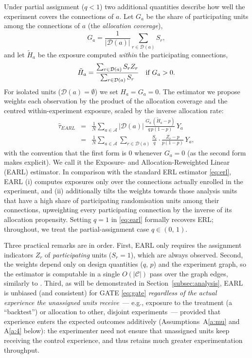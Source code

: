\documentclass[sigconf,anonymous,review]{acmart}
\begin{document}
Under partial assignment ($q<1$) two additional quantities describe how well the experiment covers the connections of $a$. Let $G_a$ be the share of participating units among the connections of $a$ (the \emph{allocation coverage}),
\begin{equation}\label{eq:Ga}
    G_a = \frac{1}{|\mathcal{D}(a)|}\sum_{r\in\mathcal{D}(a)} S_r,
\end{equation}
and let $\tilde H_a$ be the exposure computed \emph{within} the participating connections,
\begin{equation}\label{eq:Hta}
    \tilde H_a = \frac{\sum_{r\in\mathcal{D}(a)} S_rZ_r}{\sum_{r\in\mathcal{D}(a)} S_r}\quad\textup{if } G_a>0.
\end{equation}
For isolated units ($\mathcal D(a)=\emptyset$) we set $H_a = G_a = 0$.
The estimator we propose weights each observation by the product of the allocation coverage and the centred within-experiment exposure, scaled by the inverse allocation rate:
\begin{eqnarray}\label{eq:earl}
    \hat \tau_{EARL} &=& \frac 1 N \sum_{a\in \mathcal A} |\mathcal D(a)|\,\frac{G_a\,(\tilde H_a - p)}{q\,p(1-p)}\, Y_a \nonumber\\
    &=& \frac 1 N \sum_{a\in \mathcal A} \sum_{r\in\mathcal{D}(a)}\frac{S_r}{q}\cdot\frac{Z_r - p}{p(1-p)}\, Y_a,
\end{eqnarray}
with the convention that the first form is $0$ whenever $G_a=0$ (as the second form makes explicit). We call it the Exposure- and Allocation-Reweighted Linear (EARL) estimator. In comparison with the standard ERL estimator \eqref{eq:erl}, EARL (i) computes exposures only over the connections actually enrolled in the experiment, and (ii) additionally tilts the weights towards those analysis units that have a high share of participating randomisation units among their connections, upweighting every participating connection by the inverse of its allocation propensity. Setting $q=1$ in \eqref{eq:earl} formally recovers ERL; throughout, we treat the partial-assignment case $q\in(0,\,1)$.

Three practical remarks are in order. First, EARL only requires the assignment indicators $Z_r$ of \emph{participating} units ($S_r=1$), which are always observed. Second, the weights depend only on design quantities ($q$, $p$) and the experiment graph, so the estimator is computable in a single $O(|\mathcal C|)$ pass over the graph edges, similarly to \cite{shi2025scalableanalysisbipartiteexperiments}. Third, as will be demonstrated in Section~\ref{subsec:analysis}, EARL is unbiased (and consistent) for GATE \eqref{eq:gate} \emph{regardless of the actual experience the unassigned units receive}~--- e.g., exposure to the treatment (a ``backtest'') or allocation to other, disjoint experiments~--- provided that experience enters the expected outcomes additively (Assumptions~A\ref{a:mu} and A\ref{a:4} below): the experimenter need not ensure that unassigned units keep receiving the control experience, and thus retains much greater experimentation throughput.
\end{document}
